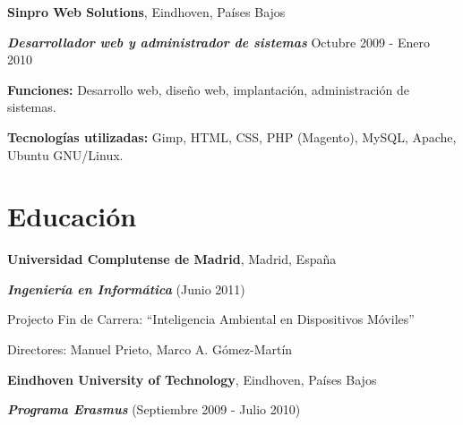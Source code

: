 \documentclass[margin,line]{resume}
\begin{document}
\begin{resume}

{\bf Sinpro Web Solutions}, Eindhoven, Países Bajos

\vspace{-.3cm}
{\bf \em Desarrollador web y administrador de sistemas} \hfill { Octubre 2009 -
Enero 2010}
\begin{list2}
\vspace*{.05in}
\item {\bf Funciones: }{Desarrollo web, diseño web, implantación, administración de
sistemas.}
\item {\bf Tecnologías utilizadas: }{Gimp, HTML, CSS, PHP (Magento), MySQL,
Apache, Ubuntu GNU/Linux.}
\end{list2}

\section{\sc Educación}
{\bf Universidad Complutense de Madrid}, Madrid, España\\
\vspace*{-.1in}
\begin{list1}
\item[] {\bf \em Ingeniería en Informática }(Junio 2011) 
\begin{list2}
\vspace*{.05in}
\item Projecto Fin de Carrera:  ``Inteligencia Ambiental en Dispositivos Móviles'' 
\item Directores:  Manuel Prieto, Marco A. Gómez-Martín
\end{list2}
\end{list1}


{\bf Eindhoven University of Technology}, Eindhoven, Países Bajos\\
\vspace*{-.1in}
\begin{list1}
\item[] {\bf \em Programa Erasmus} (Septiembre 2009 - Julio 2010) 
\end{list1}


\end{resume}
\end{document}
